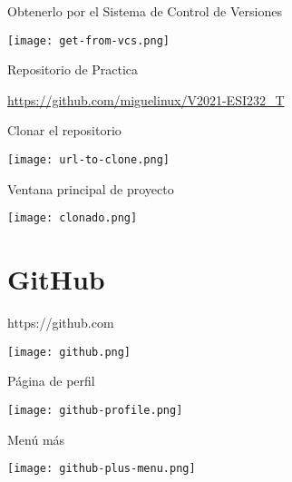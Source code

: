 \begin{frame}[c]{Obtenerlo por el Sistema de Control de Versiones}
    \begin{center}
        \texttt{[image: get-from-vcs.png]}
    \end{center}
\end{frame}

\begin{frame}[c]{Repositorio de Practica}
    \begin{center}
        \href{https://github.com/miguelinux/V2021-ESI232_T}{
            https://github.com/miguelinux/V2021-ESI232\_T}
    \end{center}
\end{frame}

\begin{frame}[c]{Clonar el repositorio}
    \begin{center}
        \texttt{[image: url-to-clone.png]}
    \end{center}
\end{frame}

\begin{frame}[c]{Ventana principal de proyecto}
    \begin{center}
        \texttt{[image: clonado.png]}
    \end{center}
\end{frame}


\section{GitHub}

\begin{frame}[c]{https://github.com}
    \begin{center}
        \texttt{[image: github.png]}
    \end{center}
\end{frame}

\begin{frame}[c]{Página de perfil}
    \begin{center}
        \texttt{[image: github-profile.png]}
    \end{center}
\end{frame}

\begin{frame}[c]{Menú más}
    \begin{center}
        \texttt{[image: github-plus-menu.png]}
    \end{center}
\end{frame}

